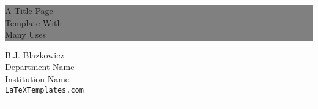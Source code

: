 %
%
%
% 


	
	\colorbox{grey}{
		\parbox[t]{0.93\textwidth}{ %
			\parbox[t]{0.91\textwidth}{ %
				\raggedleft %
				\fontsize{50pt}{80pt}\selectfont %
				\vspace{0.7cm} %
				
				A Title Page\\
				Template With\\
				Many Uses\\
				
				\vspace{0.7cm} %
			}
		}
	}
	
	\vfill %
	
	
	\parbox[t]{0.93\textwidth}{ %
		\raggedleft %
		\large %
		{\Large B.J. Blazkowicz}\\[4pt] %
		Department Name\\
		Institution Name\\[4pt] %
		\texttt{LaTeXTemplates.com}\\
		
		\hfill\rule{0.2\linewidth}{1pt}%
	}
